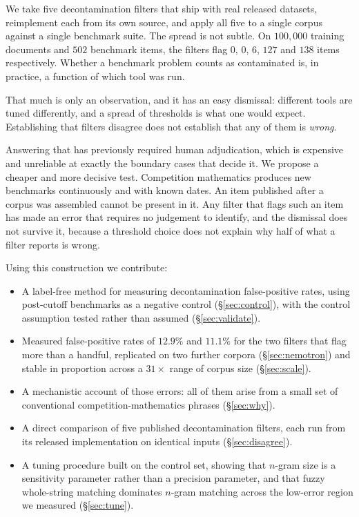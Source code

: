 \documentclass[11pt]{article}
\begin{document}
We take five decontamination filters that ship with real released datasets,
reimplement each from its own source, and apply all five to a single corpus
against a single benchmark suite. The spread is not subtle. On $100{,}000$
training documents and $502$ benchmark items, the filters flag $0$, $0$, $6$,
$127$ and $138$ items respectively. Whether a benchmark problem counts as
contaminated is, in practice, a function of which tool was run.

That much is only an observation, and it has an easy dismissal: different tools
are tuned differently, and a spread of thresholds is what one would expect.
Establishing that filters disagree does not establish that any of them is
\emph{wrong}.

Answering that has previously required human adjudication, which is expensive and
unreliable at exactly the boundary cases that decide it. We propose a cheaper and
more decisive test. Competition mathematics produces new benchmarks continuously
and with known dates. An item published after a corpus was assembled cannot be
present in it. Any filter that flags such an item has made an error that requires
no judgement to identify, and the dismissal does not survive it, because a
threshold choice does not explain why half of what a filter reports is wrong.

Using this construction we contribute:

\begin{itemize}
\item A label-free method for measuring decontamination false-positive rates,
using post-cutoff benchmarks as a negative control (\S\ref{sec:control}), with the
control assumption tested rather than assumed (\S\ref{sec:validate}).
\item Measured false-positive rates of $12.9\%$ and $11.1\%$ for the two filters
that flag more than a handful, replicated on two further corpora
(\S\ref{sec:nemotron}) and stable in proportion across a
$31\times$ range of corpus size (\S\ref{sec:scale}).
\item A mechanistic account of those errors: all of them arise from a small set of
conventional competition-mathematics phrases (\S\ref{sec:why}).
\item A direct comparison of five published decontamination filters, each run from
its released implementation on identical inputs (\S\ref{sec:disagree}).
\item A tuning procedure built on the control set, showing that $n$-gram size is a
sensitivity parameter rather than a precision parameter, and that fuzzy
whole-string matching dominates $n$-gram matching across the low-error region we
measured (\S\ref{sec:tune}).
\end{itemize}
\end{document}
